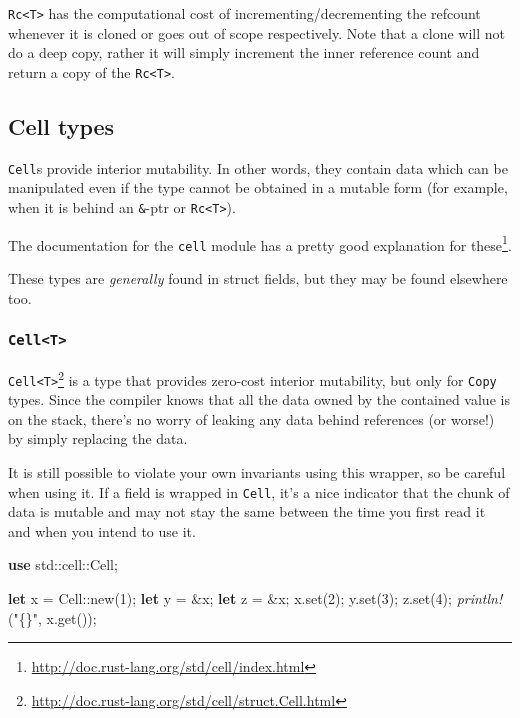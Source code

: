 \documentclass[a4paper,]{book}
\newenvironment{Shaded}{\begin{snugshade}}{\end{snugshade}}
\newcommand{\KeywordTok}[1]{\textcolor[rgb]{0.13,0.29,0.53}{\textbf{{#1}}}}
\newcommand{\DecValTok}[1]{\textcolor[rgb]{0.00,0.00,0.81}{{#1}}}
\newcommand{\StringTok}[1]{\textcolor[rgb]{0.31,0.60,0.02}{{#1}}}
\newcommand{\PreprocessorTok}[1]{\textcolor[rgb]{0.56,0.35,0.01}{\textit{{#1}}}}
\newcommand{\NormalTok}[1]{{#1}}
\renewcommand{\href}[2]{#2\footnote{\url{#1}}}
\begin{document}
\texttt{Rc\textless{}T\textgreater{}} has the computational cost of
incrementing/decrementing the refcount whenever it is cloned or goes out
of scope respectively. Note that a clone will not do a deep copy, rather
it will simply increment the inner reference count and return a copy of
the \texttt{Rc\textless{}T\textgreater{}}.

\subsection{Cell types}\label{cell-types}

\texttt{Cell}s provide interior mutability. In other words, they contain
data which can be manipulated even if the type cannot be obtained in a
mutable form (for example, when it is behind an \texttt{\&}-ptr or
\texttt{Rc\textless{}T\textgreater{}}).

\href{http://doc.rust-lang.org/std/cell/index.html}{The documentation
for the \texttt{cell} module has a pretty good explanation for these}.

These types are \emph{generally} found in struct fields, but they may be
found elsewhere too.

\subsubsection{\texorpdfstring{\texttt{Cell\textless{}T\textgreater{}}}{Cell\textless{}T\textgreater{}}}\label{cellt}

\href{http://doc.rust-lang.org/std/cell/struct.Cell.html}{\texttt{Cell\textless{}T\textgreater{}}}
is a type that provides zero-cost interior mutability, but only for
\texttt{Copy} types. Since the compiler knows that all the data owned by
the contained value is on the stack, there's no worry of leaking any
data behind references (or worse!) by simply replacing the data.

It is still possible to violate your own invariants using this wrapper,
so be careful when using it. If a field is wrapped in \texttt{Cell},
it's a nice indicator that the chunk of data is mutable and may not stay
the same between the time you first read it and when you intend to use
it.

\begin{Shaded}
\begin{Highlighting}[]
\KeywordTok{use} \NormalTok{std::cell::Cell;}

\KeywordTok{let} \NormalTok{x = Cell::new(}\DecValTok{1}\NormalTok{);}
\KeywordTok{let} \NormalTok{y = &x;}
\KeywordTok{let} \NormalTok{z = &x;}
\NormalTok{x.set(}\DecValTok{2}\NormalTok{);}
\NormalTok{y.set(}\DecValTok{3}\NormalTok{);}
\NormalTok{z.set(}\DecValTok{4}\NormalTok{);}
\PreprocessorTok{println!}\NormalTok{(}\StringTok{"\{\}"}\NormalTok{, x.get());}
\end{Highlighting}
\end{Shaded}
\end{document}
